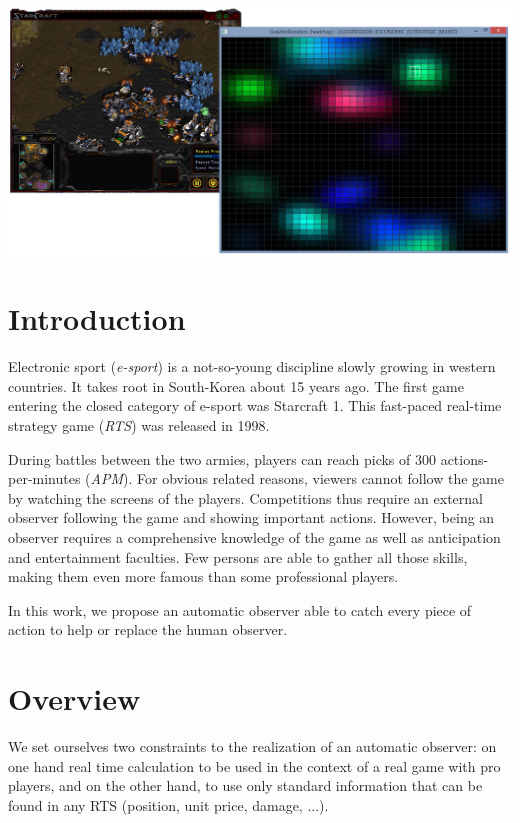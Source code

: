 \documentclass{jfsma}
\begin{document}
	\maketitle
	
	\begin{strip}
  \centering\noindent
  \includegraphics[scale=0.35]{gfx/GB}
  \vspace{0.3cm}
\end{strip}

	\section{Introduction}
    	Electronic sport (\textit{e-sport}) is a not-so-young discipline slowly growing in western countries.
        It takes root in South-Korea about 15 years ago. 
        The first game entering the closed category of e-sport was Starcraft 1. %
        This fast-paced real-time strategy game (\textit{RTS}) was released in 1998.
        
        During battles between the two armies, players can reach picks of 300 actions-per-minutes (\textit{APM}).
        For obvious related reasons, viewers cannot follow the game by watching the screens of the players.
        Competitions thus require an external observer following the game and showing important actions.
        However, being an observer requires a comprehensive knowledge of the game as well as anticipation and entertainment faculties. 
        Few persons are able to gather all those skills, making them even more famous than some professional players.
        
        \medskip
        In this work, we propose an automatic observer able to catch every piece of action to help or replace the human observer.
        
\section{Overview}
We set ourselves two constraints to the realization of an automatic observer: on one hand real time calculation to be used in the context of a real game with pro players, and on the other hand, to use only standard information that can be found in any RTS (position, unit price, damage, ...).
\end{document}
